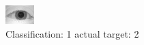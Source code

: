 \begin{figure}[h!]
\begin{center}
\includegraphics[width=0.60\columnwidth]{figures/ID975_class_1_target_2.png}
\end{center}
\caption{ Classification: 1 actual target: 2}
\label{fig:ID975_class_1_target_2}
\end{figure}
